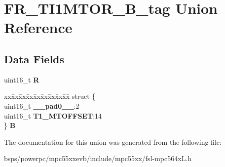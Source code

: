\hypertarget{unionFR__TI1MTOR__16B__tag}{}\section{F\+R\+\_\+\+T\+I1\+M\+T\+O\+R\+\_\+B\+\_\+tag Union Reference}
\label{unionFR__TI1MTOR__16B__tag}
\subsection*{Data Fields}
\begin{DoxyCompactItemize}
\item 
\mbox{\label{unionFR__TI1MTOR__16B__tag_ac630b2a2de1c3cdb3c5ad1dd7977df6b}} 
uint16\+\_\+t {\bfseries R}
\item 
\mbox{\label{unionFR__TI1MTOR__16B__tag_afe40947f15e72ef657f22dd27cfb552c}} 
\begin{tabbing}
xx\=xx\=xx\=xx\=xx\=xx\=xx\=xx\=xx\=\kill
struct \{\\
\>uint16\_t {\bfseries \_\_pad0\_\_}:2\\
\>uint16\_t {\bfseries T1\_MTOFFSET}:14\\
\} {\bfseries B}\\

\end{tabbing}\end{DoxyCompactItemize}


The documentation for this union was generated from the following file\+:\begin{DoxyCompactItemize}
\item 
bsps/powerpc/mpc55xxevb/include/mpc55xx/fsl-\/mpc564x\+L.\+h\end{DoxyCompactItemize}
